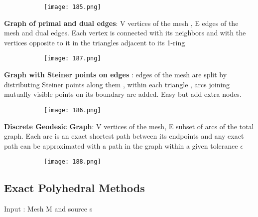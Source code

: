 \documentclass{article}
\begin{document}
   \begin{figure}[ht!]
  \centering
  \begin{subfigure}[b]{0.3\linewidth}
    \texttt{[image: 185.png]}
  \end{subfigure}
\end{figure}

\vspace{40mm}

\textbf{Graph of primal and dual edges}: V vertices of the mesh , E edges of the mesh and dual edges. Each vertex is connected with its neighbors and with the vertices opposite to it in the triangles adjacent to its 1-ring

   \begin{figure}[ht!]
  \centering
  \begin{subfigure}[b]{0.3\linewidth}
    \texttt{[image: 187.png]}
  \end{subfigure}
\end{figure}


\textbf{Graph with Steiner points on edges} : edges of the mesh are split by distributing Steiner points along them , within each triangle , arcs joining mutually visible points on its boundary are added. Easy but add extra nodes.

   \begin{figure}[ht!]
  \centering
  \begin{subfigure}[b]{0.3\linewidth}
    \texttt{[image: 186.png]}
  \end{subfigure}
\end{figure}

\textbf{Discrete Geodesic Graph}: V vertices of the mesh, E subset of arcs of the total graph. Each arc is an exact shortest path between its endpoints and any exact path can be approximated with a path in the graph within a given tolerance $\epsilon$

   \begin{figure}[ht!]
  \centering
  \begin{subfigure}[b]{0.3\linewidth}
    \texttt{[image: 188.png]}
  \end{subfigure}
\end{figure}

\subsection{Exact Polyhedral Methods}

Input : Mesh M and source s
\end{document}

